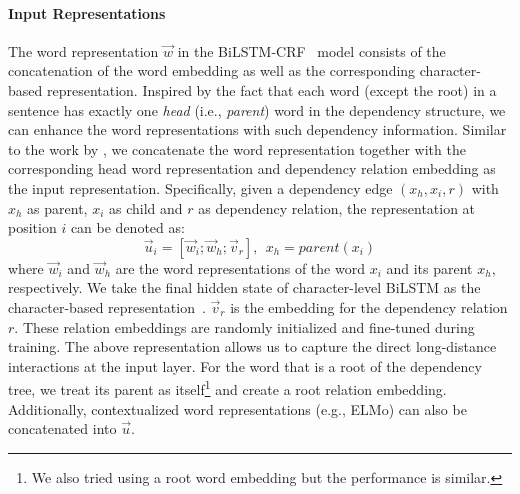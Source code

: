 \paragraph{Input Representations}
The word representation $\vec{w}$ in the BiLSTM-CRF~\cite{lample2016neural,ma2016end,D17-1035} model consists of the concatenation of the word embedding as well as the corresponding character-based representation. 
Inspired by the fact that each word (except the root) in a sentence has exactly one \textit{head} (i.e., \textit{parent}) word in the dependency structure, we can enhance the word representations with such dependency information. 
Similar to the work by \citet{miwa2016end}, we concatenate the word representation together with the corresponding head word representation and dependency relation embedding as the input representation. 
Specifically, given a dependency edge $(x_h, x_i, r)$ with $x_h$ as parent, $x_i$ as child and $r$ as dependency relation, the representation at position $i$ can be denoted as:
\begin{equation}
\vec{u}_i = \left [
\vec{w}_i; \vec{w}_h; \vec{v}_{r}	
\right ], ~~ x_h = parent(x_i)
\label{equ:rep}
\end{equation}
where $\vec{w}_i$ and $\vec{w}_h$ are the word representations of the word $x_i$ and its parent $x_h$, respectively. 
We take the final hidden state of character-level BiLSTM as the character-based representation~\cite{lample2016neural}.
$\vec{v}_r$ is the embedding for the dependency relation $r$. 
These relation embeddings are randomly initialized and fine-tuned during training. 
The above representation allows us to capture the direct long-distance interactions at the input layer. 
For the word that is a root of the dependency tree, we treat its parent as itself\footnote{We also tried using a root word embedding but the performance is similar.} and create a root relation embedding. 
Additionally, contextualized word representations (e.g., ELMo) can also be concatenated into $\vec{u}$.

